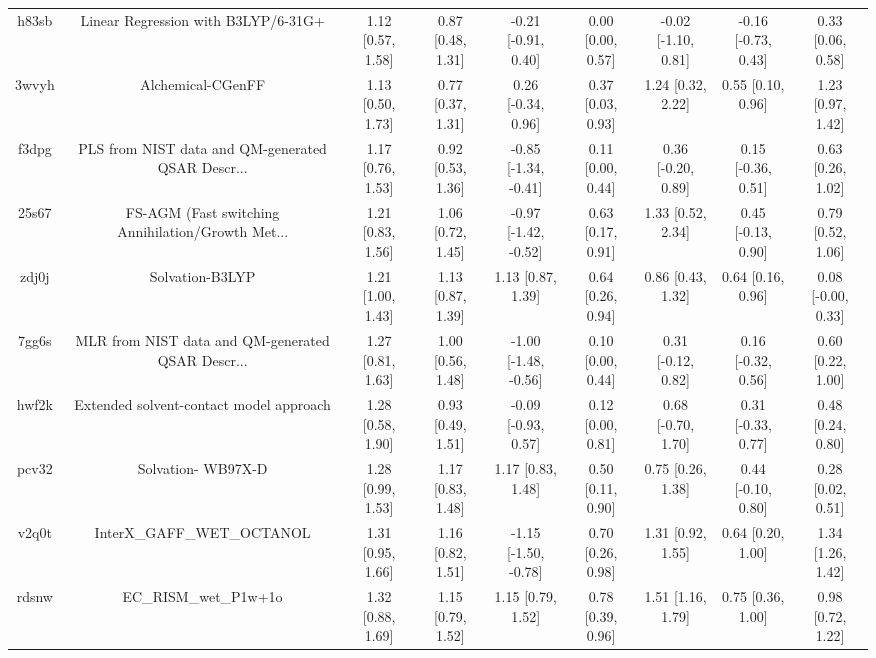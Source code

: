 \documentclass{article}
\begin{document}
\begin{center}
\begin{longtable}{|ccccccccc|}
 h83sb &                Linear Regression with B3LYP/6-31G+ &  1.12 [0.57, 1.58] &  0.87 [0.48, 1.31] &   -0.21 [-0.91, 0.40] &  0.00 [0.00, 0.57] &  -0.02 [-1.10, 0.81] &  -0.16 [-0.73, 0.43] &     0.33 [0.06, 0.58] \\
 3wvyh &                                  Alchemical-CGenFF &  1.13 [0.50, 1.73] &  0.77 [0.37, 1.31] &    0.26 [-0.34, 0.96] &  0.37 [0.03, 0.93] &    1.24 [0.32, 2.22] &    0.55 [0.10, 0.96] &     1.23 [0.97, 1.42] \\
 f3dpg &  PLS from NIST data and QM-generated QSAR Descr... &  1.17 [0.76, 1.53] &  0.92 [0.53, 1.36] &  -0.85 [-1.34, -0.41] &  0.11 [0.00, 0.44] &   0.36 [-0.20, 0.89] &   0.15 [-0.36, 0.51] &     0.63 [0.26, 1.02] \\
 25s67 &  FS-AGM (Fast switching Annihilation/Growth Met... &  1.21 [0.83, 1.56] &  1.06 [0.72, 1.45] &  -0.97 [-1.42, -0.52] &  0.63 [0.17, 0.91] &    1.33 [0.52, 2.34] &   0.45 [-0.13, 0.90] &     0.79 [0.52, 1.06] \\
 zdj0j &                                    Solvation-B3LYP &  1.21 [1.00, 1.43] &  1.13 [0.87, 1.39] &     1.13 [0.87, 1.39] &  0.64 [0.26, 0.94] &    0.86 [0.43, 1.32] &    0.64 [0.16, 0.96] &    0.08 [-0.00, 0.33] \\
 7gg6s &  MLR from NIST data and QM-generated QSAR Descr... &  1.27 [0.81, 1.63] &  1.00 [0.56, 1.48] &  -1.00 [-1.48, -0.56] &  0.10 [0.00, 0.44] &   0.31 [-0.12, 0.82] &   0.16 [-0.32, 0.56] &     0.60 [0.22, 1.00] \\
 hwf2k &            Extended solvent-contact model approach &  1.28 [0.58, 1.90] &  0.93 [0.49, 1.51] &   -0.09 [-0.93, 0.57] &  0.12 [0.00, 0.81] &   0.68 [-0.70, 1.70] &   0.31 [-0.33, 0.77] &     0.48 [0.24, 0.80] \\
 pcv32 &                                 Solvation- WB97X-D &  1.28 [0.99, 1.53] &  1.17 [0.83, 1.48] &     1.17 [0.83, 1.48] &  0.50 [0.11, 0.90] &    0.75 [0.26, 1.38] &   0.44 [-0.10, 0.80] &     0.28 [0.02, 0.51] \\
 v2q0t &                         InterX\_GAFF\_WET\_OCTANOL &  1.31 [0.95, 1.66] &  1.16 [0.82, 1.51] &  -1.15 [-1.50, -0.78] &  0.70 [0.26, 0.98] &    1.31 [0.92, 1.55] &    0.64 [0.20, 1.00] &     1.34 [1.26, 1.42] \\
 rdsnw &                              EC\_RISM\_wet\_P1w+1o &  1.32 [0.88, 1.69] &  1.15 [0.79, 1.52] &     1.15 [0.79, 1.52] &  0.78 [0.39, 0.96] &    1.51 [1.16, 1.79] &    0.75 [0.36, 1.00] &     0.98 [0.72, 1.22] \\

\end{longtable}
\end{center}
\end{document}

